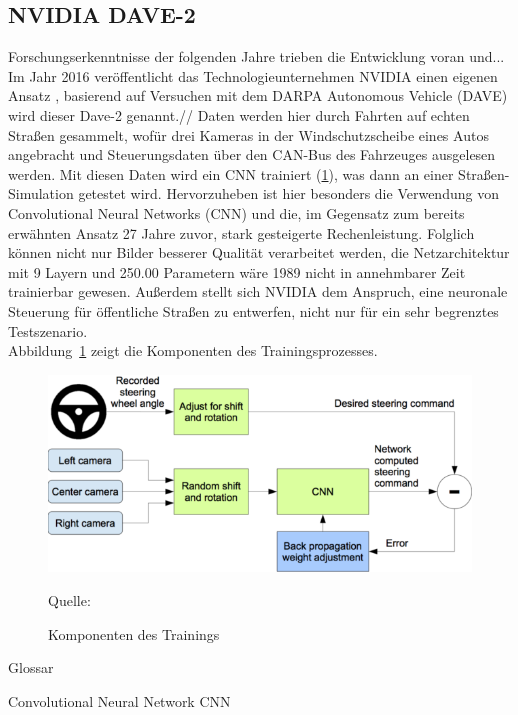 \subsection{NVIDIA DAVE-2}

Forschungserkenntnisse der folgenden Jahre trieben die Entwicklung voran und...
Im Jahr 2016 veröffentlicht das Technologieunternehmen \textsc{NVIDIA} einen eigenen Ansatz \cite{bojarski2016end}, basierend auf Versuchen mit dem \glqq DARPA Autonomous Vehicle \grqq{} (DAVE)  wird dieser \glqq Dave-2 \grqq{} genannt.//
Daten werden hier durch Fahrten auf echten Straßen gesammelt, wofür drei Kameras in der Windschutzscheibe eines Autos angebracht und Steuerungsdaten über den CAN-Bus des Fahrzeuges ausgelesen werden. Mit diesen Daten wird ein CNN trainiert (\ref{img:NVIDIA}), was dann an einer Straßen-Simulation getestet wird. Hervorzuheben ist hier besonders die Verwendung von Convolutional Neural Networks (CNN) und die, im Gegensatz zum bereits erwähnten Ansatz 27 Jahre zuvor, stark gesteigerte Rechenleistung. Folglich können nicht nur Bilder besserer Qualität verarbeitet werden, die Netzarchitektur mit 9 Layern und 250.00 Parametern wäre 1989 nicht in annehmbarer Zeit trainierbar gewesen. Außerdem stellt sich NVIDIA dem Anspruch, eine neuronale Steuerung für öffentliche Straßen zu entwerfen, nicht nur für ein sehr begrenztes Testszenario.\\

Abbildung~\ref{img:NVIDIA} zeigt die Komponenten des Trainingsprozesses. 



\begin{figure}
	\centering
	\includegraphics[scale=0.5]{figures/NVIDIA-Training.png}
	\caption{Komponenten des Trainings}
	Quelle: 
	\label{img:NVIDIA}
\end{figure}





Glossar

Convolutional Neural Network CNN



